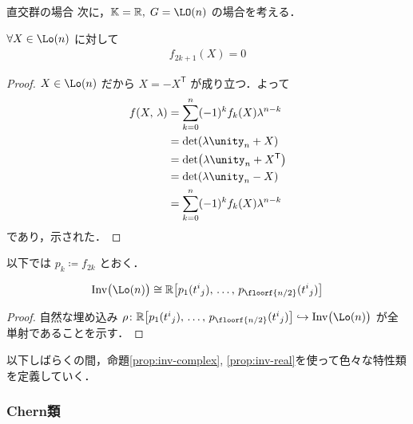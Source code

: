 \documentclass[TQFT_main]{subfiles}
\begin{document}
\begin{myexample}[label=case:orthogonal]{直交群の場合}
    次に，$\mathbb{K} = \mathbb{R},\; G = \LO(n)$ の場合を考える．
    
    \begin{mylem}[label=lem:odd-vanish]{}
        $\forall X \in \Lo(n)$ に対して
        \begin{align}
            f_{2k+1}(X) = 0
        \end{align}
    \end{mylem}
    
    \begin{proof}
        $X \in \Lo(n)$ だから $X = - X^{\mathsf{T}}$ が成り立つ．よって
        \begin{align}
            f(X,\, \lambda)
            &=  \sum_{k=0}^n (-1)^k f_k(X) \lambda^{n-k} \\
            &= \det(\lambda \unity_n + X) \\
            &= \det(\lambda \unity_n + X^{\mathsf{T}}) \\
            &= \det(\lambda \unity_n - X) \\
            &= \sum_{k=0}^n (-1)^k f_k(X) \lambda^{n-k}
        \end{align}
        であり，示された．
    \end{proof}
    
    以下では $p_k \coloneqq f_{2k}$ とおく．

    \begin{myprop}[label=prop:inv-ortho]{}
        \begin{align}
            \mathrm{Inv} \bigl( \Lo(n) \bigr) \cong \mathbb{R} \bigl[p_1(t^i{}_j),\, \dots,\, p_{\floorf{n/2}}(t^i{}_j)\bigr]
        \end{align}
    \end{myprop}
    
    \begin{proof}
        自然な埋め込み $\rho \colon \mathbb{R}\bigl[p_1(t^i{}_j),\, \dots,\, p_{\floorf{n/2}}(t^i{}_j)\bigr] \hookrightarrow \mathrm{Inv} \bigl( \Lo(n) \bigr)$ が全単射であることを示す．

    \end{proof}
    
\end{myexample}


以下しばらくの間，命題\ref{prop:inv-complex}, \ref{prop:inv-real}を使って色々な特性類を定義していく．

\subsubsection{Chern類}
\end{document}
